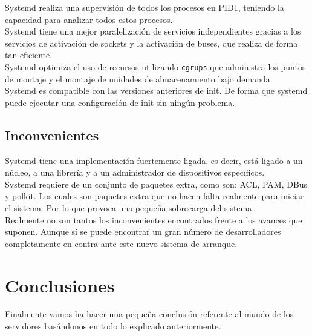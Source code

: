 Systemd realiza una supervisión de todos los procesos en PID1, teniendo la capacidad para analizar todos estos procesos.\\

Systemd tiene una mejor paralelización de servicios independientes gracias a los servicios de activación de sockets y la activación de buses, que realiza de forma tan eficiente.\\

Systemd optimiza el uso de recursos utilizando \texttt{cgrups} que administra los puntos de montaje y el montaje de unidades de almacenamiento bajo demanda.\\

Systemd es compatible con las versiones anteriores de init. De forma que systemd puede ejecutar una configuración de init sin ningún problema.

\subsection{Inconvenientes}

Systemd tiene una implementación fuertemente ligada, es decir, está ligado a un núcleo, a una librería y a un administrador de dispositivos específicos.\\

Systemd requiere de un conjunto de paquetes extra, como son: ACL, PAM, DBus y polkit. Los cuales son paquetes extra que no hacen falta realmente para iniciar el sistema. Por lo que provoca una pequeña sobrecarga del sistema.\\

Realmente no son tantos los inconvenientes encontrados frente a los avances que suponen. Aunque sí se puede encontrar un gran número de desarrolladores completamente en contra ante este nuevo sistema de arranque.


\section{Conclusiones} %
Finalmente vamos ha hacer una pequeña conclusión referente al mundo de los servidores basándonos en todo lo explicado anteriormente.\\

